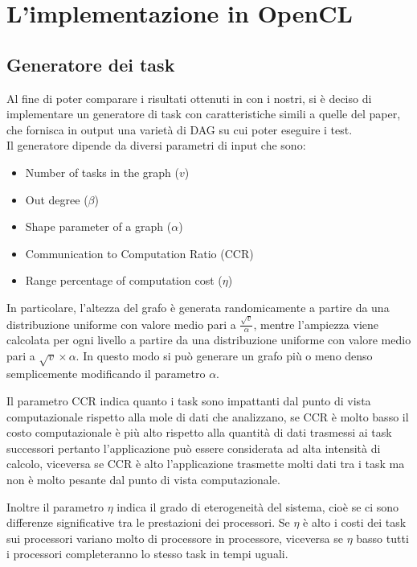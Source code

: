 \chapter{L'implementazione in OpenCL}
\vspace{4cm}


\section{Generatore dei task}
Al fine di poter comparare i risultati ottenuti in\cite{ilavarasan2007low} con i nostri, si è deciso di implementare un generatore di task con caratteristiche simili a quelle del paper, che fornisca in output una varietà di DAG su cui poter eseguire i test.
\\
Il generatore dipende da diversi parametri di input che sono:
\begin{itemize}
	\item{Number of tasks in the graph ($v$)}
	\item{Out degree ($\beta$)}
	\item{Shape parameter of a graph ($\alpha$)}
	\item{Communication to Computation Ratio (CCR)}
	\item{Range percentage of computation cost ($\eta$)}
\end{itemize}

In particolare, l'altezza del grafo è generata randomicamente a partire da una distribuzione uniforme con valore medio pari a $\frac{\sqrt{v}}{\alpha}$, mentre l'ampiezza viene calcolata per ogni livello a partire da una distribuzione uniforme con valore medio pari a $\sqrt{v}\times\alpha$.
In questo modo si può generare un grafo più o meno denso semplicemente modificando il parametro $\alpha$.


Il parametro CCR indica quanto i task sono impattanti dal punto di vista computazionale rispetto alla mole di dati che analizzano, se CCR è molto basso il costo computazionale è più alto rispetto alla quantità di dati trasmessi ai task successori pertanto l'applicazione può essere considerata ad alta intensità di calcolo, viceversa se CCR è alto l'applicazione trasmette molti dati tra i task ma non è molto pesante dal punto di vista computazionale.

Inoltre il parametro $\eta$ indica il grado di eterogeneità del sistema, cioè se ci sono differenze significative tra le prestazioni dei processori. Se $\eta$ è alto i costi dei task sui processori variano molto di processore in processore, viceversa se $\eta$ basso tutti i processori completeranno lo stesso task in tempi uguali. 

